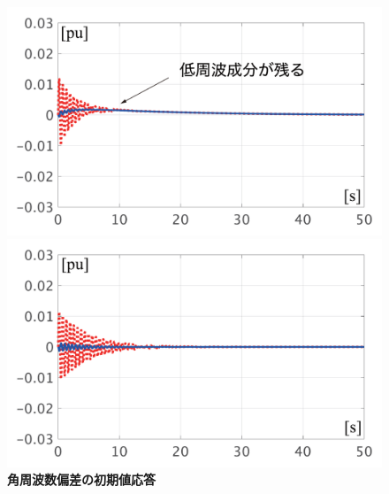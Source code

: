 \documentclass[tombow,dvipdfmx]{corona-a5-1.1}
\begin{document}
\begin{figure}[t]
  \centering
  {
  \begin{minipage}{0.49\linewidth}
    \centering
    \includegraphics[width = 1.0\linewidth]{figs/woAVRsmall}
  \end{minipage}
  \begin{minipage}{0.49\linewidth}
    \centering
    \includegraphics[width = 1.0\linewidth]{figs/wAVRsmall}
  \end{minipage}
  \medskip
  \caption{\textbf{角周波数偏差の初期値応答}
  \\ 
  }
  \label{fig:avrsmalld}
  }
\medskip
\end{figure}
\end{document}
